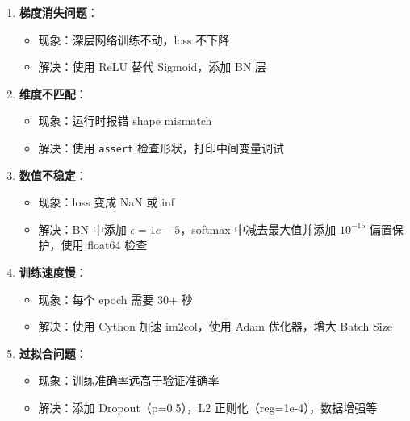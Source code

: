 \documentclass[a4paper]{article}
\begin{document}
\begin{enumerate}
    \item \textbf{梯度消失问题}：
    \begin{itemize}
        \item 现象：深层网络训练不动，loss 不下降
        \item 解决：使用 ReLU 替代 Sigmoid，添加 BN 层
    \end{itemize}
    
    \item \textbf{维度不匹配}：
    \begin{itemize}
        \item 现象：运行时报错 shape mismatch
        \item 解决：使用 \texttt{assert} 检查形状，打印中间变量调试
    \end{itemize}
    
    \item \textbf{数值不稳定}：
    \begin{itemize}
        \item 现象：loss 变成 NaN 或 inf
        \item 解决：BN 中添加 $\epsilon=1e-5$，softmax 中减去最大值并添加 $10^{-15}$ 偏置保护，使用 float64 检查
    \end{itemize}
    
    \item \textbf{训练速度慢}：
    \begin{itemize}
        \item 现象：每个 epoch 需要 30+ 秒
        \item 解决：使用 Cython 加速 im2col，使用 Adam 优化器，增大 Batch Size
    \end{itemize}
    
    \item \textbf{过拟合问题}：
    \begin{itemize}
        \item 现象：训练准确率远高于验证准确率
        \item 解决：添加 Dropout（p=0.5），L2 正则化（reg=1e-4），数据增强等
    \end{itemize}
\end{enumerate}
\end{document}
